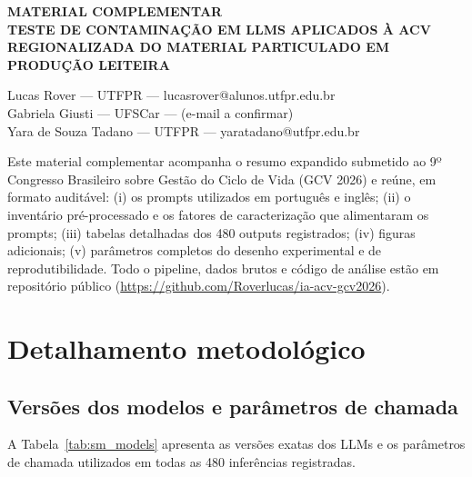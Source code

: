 \documentclass[12pt,a4paper]{article}
\begin{document}
\begin{center}
{\bfseries\uppercase{Material Complementar}}\\[4pt]
{\bfseries\uppercase{Teste de contaminação em LLMs aplicados à ACV regionalizada do material particulado em produção leiteira}}
\end{center}

\vspace{0.5\baselineskip}

\begin{flushright}
\small
Lucas Rover --- UTFPR --- lucasrover@alunos.utfpr.edu.br\\
Gabriela Giusti --- UFSCar --- (e-mail a confirmar)\\
Yara de Souza Tadano --- UTFPR --- yaratadano@utfpr.edu.br
\end{flushright}

\vspace{0.5\baselineskip}

Este material complementar acompanha o resumo expandido submetido ao 9º Congresso Brasileiro sobre Gestão do Ciclo de Vida (GCV 2026) e reúne, em formato auditável: (i) os prompts utilizados em português e inglês; (ii) o inventário pré-processado e os fatores de caracterização que alimentaram os prompts; (iii) tabelas detalhadas dos 480 outputs registrados; (iv) figuras adicionais; (v) parâmetros completos do desenho experimental e de reprodutibilidade. Todo o pipeline, dados brutos e código de análise estão em repositório público (\url{https://github.com/Roverlucas/ia-acv-gcv2026}).

\tableofcontents

\section{Detalhamento metodológico}

\subsection{Versões dos modelos e parâmetros de chamada}

A Tabela~\ref{tab:sm_models} apresenta as versões exatas dos LLMs e os parâmetros de chamada utilizados em todas as 480 inferências registradas.
\end{document}
